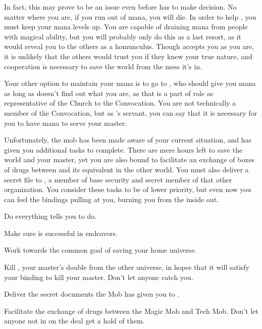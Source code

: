 \documentclass[char]{guildcamp3}
\begin{document}
	In fact, this may prove to be an issue even before \cNobleOne{} has to make \cNobleOne{\their} decision. No matter where you are, if you run out of mana, you will die. In order to help \cNobleOne{}, you must keep your mana levels up. You are capable of draining mana from people with magical ability, but you will probably only do this as a last resort, as it would reveal you to the others as a homunculus. Though \cNobleOne{} accepts you as you are, it is unlikely that the others would trust you if they knew your true nature, and cooperation is necessary to save the world from the mess it's in.
	
	Your other option to maintain your mana is to go to \cPaladin{}, who should give you mana as long as \cPaladin{\they} doesn't find out what you are, as that is a part of \cPaladin{\their} role as representative of the Church to the Convocation. You are not technically a member of the Convocation, but as \cNobleOne{}'s servant, you can say that it is necessary for you to have mana to serve your master.
	
	Unfortunately, the mob has been made aware of your current situation, and has given you additional tasks to complete. There are mere hours left to save the world and your master, yet you are also bound to facilitate an exchange of boxes of drugs between \bMagicMob{} and its equivalent in the other world. You must also deliver a secret file to \cSpecOpTwo{}, a member of base security and secret member of that other organization. You consider these tasks to be of lower priority, but even now you can feel the bindings pulling at you, burning you from the inside out.

\begin{itemz}[Goals]
	\item Do everything \cNobleOne{} tells you to do.
	\item Make sure \cNobleOne{} is successful in \cNobleOne{\their} endeavors.
	\item Work towards the common goal of saving your home universe.
	\item Kill \cPoliOne{}, your master's double from the other universe, in hopes that it will satisfy your binding to kill your master. Don't let anyone catch you.
	\item Deliver the secret documents the Mob has given you to \cSpecOpTwo{}.
	\item Facilitate the exchange of drugs between the Magic Mob and Tech Mob. Don't let anyone not in on the deal get a hold of them.
\end{itemz}
\end{document}
